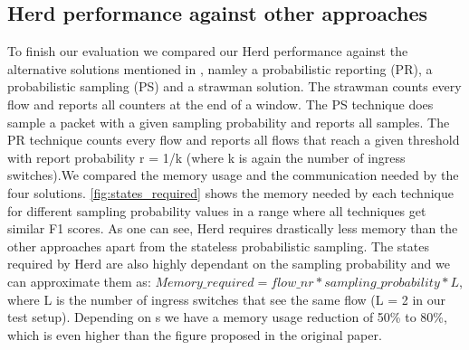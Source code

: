 \documentclass[11pt,oneside,a4paper]{article}
\begin{document}
\subsection{Herd performance against other approaches}

To finish our evaluation we compared our Herd performance against the alternative solutions mentioned in \cite{anon2019herd}, namley a probabilistic reporting (PR), a probabilistic sampling (PS) and a strawman solution. The strawman counts every flow and reports all counters at the end of a window. The PS technique does sample a packet with a given sampling probability and reports all samples. The PR technique counts every flow and reports all flows that reach a given threshold with report probability r = 1/k (where k is again the number of ingress switches).\newline We compared the memory usage and the communication needed by the four solutions. \ref{fig:states_required} shows the memory needed by each technique for different sampling probability values in a range where all techniques get similar F1 scores. As one can see, Herd requires drastically less memory than the other approaches apart from the stateless probabilistic sampling. The states required by Herd are also highly dependant on the sampling probability and we can approximate them as: $Memory\_required = flow\_nr * sampling\_probability * L$, where L is the number of ingress switches that see the same flow (L = 2 in our test setup). Depending on s we have a memory usage reduction of 50\% to 80\%, which is even higher than the figure proposed in the original paper. \newline
\end{document}
